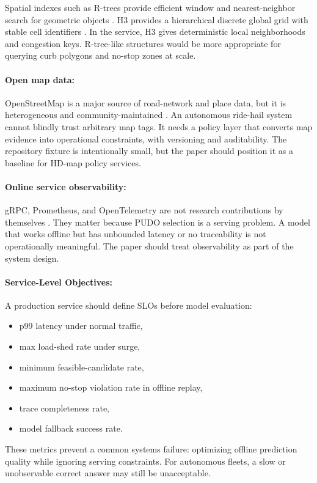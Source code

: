 \documentclass{article}
\begin{document}
Spatial indexes such as R-trees provide efficient window and nearest-neighbor search for geometric objects \citep{guttman1984rtree}. H3 provides a hierarchical discrete global grid with stable cell identifiers \citep{h3}. In the service, H3 gives deterministic local neighborhoods and congestion keys. R-tree-like structures would be more appropriate for querying curb polygons and no-stop zones at scale.

\paragraph{Open map data:}

OpenStreetMap is a major source of road-network and place data, but it is heterogeneous and community-maintained \citep{haklay2008osm}. An autonomous ride-hail system cannot blindly trust arbitrary map tags. It needs a policy layer that converts map evidence into operational constraints, with versioning and auditability. The repository fixture is intentionally small, but the paper should position it as a baseline for HD-map policy services.

\paragraph{Online service observability:}

gRPC, Prometheus, and OpenTelemetry are not research contributions by themselves \citep{grpc,prometheus,opentelemetry}. They matter because PUDO selection is a serving problem. A model that works offline but has unbounded latency or no traceability is not operationally meaningful. The paper should treat observability as part of the system design.

\paragraph{Service-Level Objectives:}

A production service should define SLOs before model evaluation:
\begin{itemize}
  \item p99 latency under normal traffic,
  \item max load-shed rate under surge,
  \item minimum feasible-candidate rate,
  \item maximum no-stop violation rate in offline replay,
  \item trace completeness rate,
  \item model fallback success rate.
\end{itemize}
These metrics prevent a common systems failure: optimizing offline prediction quality while ignoring serving constraints. For autonomous fleets, a slow or unobservable correct answer may still be unacceptable.
\end{document}
